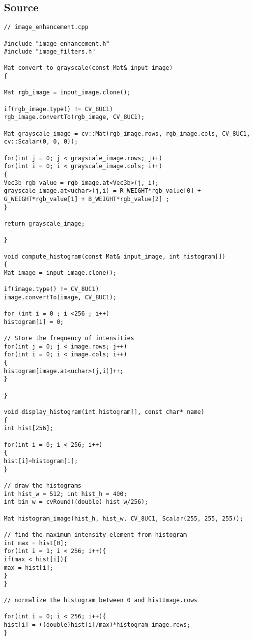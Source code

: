 \subsection{Source}
\begin{lstlisting}
// image_enhancement.cpp

#include "image_enhancement.h"
#include "image_filters.h"

Mat convert_to_grayscale(const Mat& input_image)
{

Mat rgb_image = input_image.clone();

if(rgb_image.type() != CV_8UC1)
rgb_image.convertTo(rgb_image, CV_8UC1);

Mat grayscale_image = cv::Mat(rgb_image.rows, rgb_image.cols, CV_8UC1, cv::Scalar(0, 0, 0));

for(int j = 0; j < grayscale_image.rows; j++)
for(int i = 0; i < grayscale_image.cols; i++)
{
Vec3b rgb_value = rgb_image.at<Vec3b>(j, i);
grayscale_image.at<uchar>(j,i) = R_WEIGHT*rgb_value[0] + G_WEIGHT*rgb_value[1] + B_WEIGHT*rgb_value[2] ;
}

return grayscale_image;

}

void compute_histogram(const Mat& input_image, int histogram[])
{
Mat image = input_image.clone();

if(image.type() != CV_8UC1)
image.convertTo(image, CV_8UC1);

for (int i = 0 ; i <256 ; i++)
histogram[i] = 0;

// Store the frequency of intensities
for(int j = 0; j < image.rows; j++)
for(int i = 0; i < image.cols; i++)
{
histogram[image.at<uchar>(j,i)]++;
}

}

void display_histogram(int histogram[], const char* name)
{
int hist[256];

for(int i = 0; i < 256; i++)
{
hist[i]=histogram[i];
}

// draw the histograms
int hist_w = 512; int hist_h = 400;
int bin_w = cvRound((double) hist_w/256);

Mat histogram_image(hist_h, hist_w, CV_8UC1, Scalar(255, 255, 255));

// find the maximum intensity element from histogram
int max = hist[0];
for(int i = 1; i < 256; i++){
if(max < hist[i]){
max = hist[i];
}
}

// normalize the histogram between 0 and histImage.rows

for(int i = 0; i < 256; i++){
hist[i] = ((double)hist[i]/max)*histogram_image.rows;
}



\end{lstlisting}
